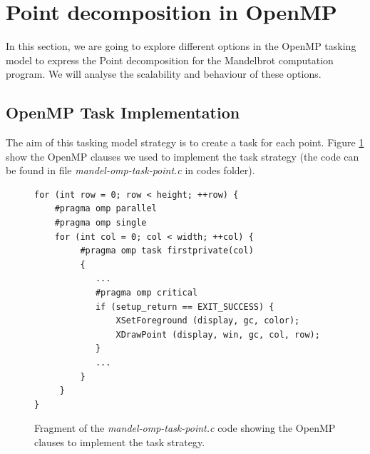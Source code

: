 \documentclass[12pt, a4paper]{article}
\begin{document}
\section{Point decomposition in OpenMP}

In this section, we are going to explore different options in the OpenMP tasking model to express the Point decomposition for the Mandelbrot computation program. We will analyse the scalability and behaviour of these options.




\subsection{OpenMP Task Implementation}

The aim of this tasking model strategy is to create a task for each point. Figure \ref{code:task_implementation_point} show the OpenMP clauses we used to implement the task strategy (the code can be found in file \textit{mandel-omp-task-point.c} in codes folder).

\begin{figure}[H]
\begin{lstlisting}
for (int row = 0; row < height; ++row) {
	#pragma omp parallel
	#pragma omp single
    for (int col = 0; col < width; ++col) {
         #pragma omp task firstprivate(col)
         {
			...
			#pragma omp critical
	        if (setup_return == EXIT_SUCCESS) {
	        	XSetForeground (display, gc, color);
	        	XDrawPoint (display, win, gc, col, row);
	        }
			...
         }
     }
}
\end{lstlisting}
\caption{Fragment of the \textit{mandel-omp-task-point.c} code showing the OpenMP clauses to implement the task strategy.}
\label{code:task_implementation_point}
\end{figure}
\end{document}
